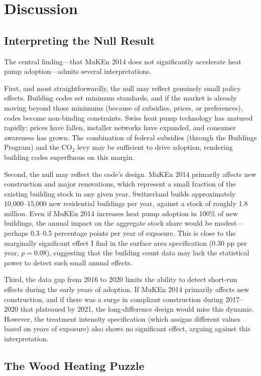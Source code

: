 \documentclass[12pt]{article}
\begin{document}
\section{Discussion}

\subsection{Interpreting the Null Result}

The central finding---that MuKEn 2014 does not significantly accelerate heat pump adoption---admits several interpretations.

First, and most straightforwardly, the null may reflect genuinely small policy effects. Building codes set minimum standards, and if the market is already moving beyond those minimums (because of subsidies, prices, or preferences), codes become non-binding constraints. Swiss heat pump technology has matured rapidly: prices have fallen, installer networks have expanded, and consumer awareness has grown. The combination of federal subsidies (through the Buildings Program) and the CO$_2$ levy may be sufficient to drive adoption, rendering building codes superfluous on this margin.

Second, the null may reflect the code's design. MuKEn 2014 primarily affects new construction and major renovations, which represent a small fraction of the existing building stock in any given year. Switzerland builds approximately 10,000--15,000 new residential buildings per year, against a stock of roughly 1.8 million. Even if MuKEn 2014 increases heat pump adoption in 100\% of new buildings, the annual impact on the aggregate stock share would be modest---perhaps 0.3--0.5 percentage points per year of exposure. This is close to the marginally significant effect I find in the surface area specification (0.30 pp per year, $p = 0.08$), suggesting that the building count data may lack the statistical power to detect such small annual effects.

Third, the data gap from 2016 to 2020 limits the ability to detect short-run effects during the early years of adoption. If MuKEn 2014 primarily affects new construction, and if there was a surge in compliant construction during 2017--2020 that plateaued by 2021, the long-difference design would miss this dynamic. However, the treatment intensity specification (which assigns different values based on years of exposure) also shows no significant effect, arguing against this interpretation.

\subsection{The Wood Heating Puzzle}
\end{document}
